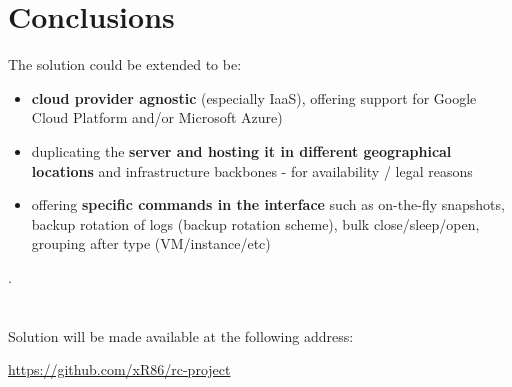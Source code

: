 \documentclass{llncs}
\begin{document}
\fi %

%
\section{Conclusions}
%

The solution could be extended to be: 

\begin{itemize}
  \item \textbf{cloud provider agnostic} (especially IaaS), offering support for Google Cloud Platform and/or Microsoft Azure)
  \item duplicating the \textbf{server and hosting it in different geographical locations} and infrastructure backbones - for availability / legal reasons
  \item offering \textbf{specific commands in the interface} such as on-the-fly snapshots, backup rotation of logs (backup rotation scheme), bulk close/sleep/open, grouping after type (VM/instance/etc)
\end{itemize}

.
%
\\
\\
\\
Solution will be made available at the following address:
 \begin{center}\url{https://github.com/xR86/rc-project}\end{center}
\end{document}
